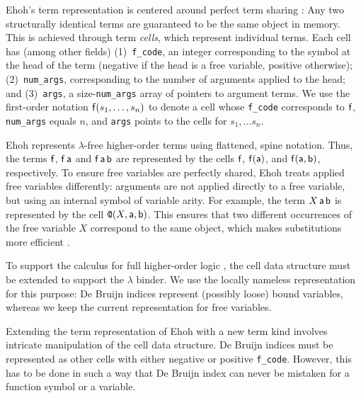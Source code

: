 Ehoh's term representation is centered around perfect term sharing %
\cite{ls-01-shared}: Any two structurally identical terms are
guaranteed to be the same object in memory. This is achieved through term
\emph{cells}, which represent individual terms. Each cell has (among other fields)
(1)~\texttt{f\_code}, an integer corresponding to the symbol at the head of the term (negative
if the head is a free variable, positive otherwise); (2)~\texttt{num\_args},
corresponding to the number of arguments applied to the head; and (3)~\texttt{args},
a size-\texttt{num\_args} array of pointers to argument terms. We
use the first-order notation $\mathsf{f}(s_1, \ldots, s_n)$ to denote a cell whose
\texttt{f\_code} corresponds to $\mathsf{f}$, \texttt{num\_args} equals $n$, and
\texttt{args} points to the cells for $s_1, \ldots s_n$.

Ehoh represents $\lambda$-free higher-order terms using flattened, spine notation.
Thus, the terms $\mathsf{f}$, $\mathsf{f} \, \mathsf{a}$ and $\mathsf{f} \, \mathsf{a} \,
\mathsf{b}$ are represented by the cells $\mathsf{f}$,
$\mathsf{f}(\mathsf{a})$, and $\mathsf{f}(\mathsf{a}, \mathsf{b})$, respectively.
To ensure free variables are
perfectly shared, Ehoh treats applied free variables differently: arguments are
not applied directly to a free variable, but using an internal symbol
\internalat{} of variable arity. For example, the term $X \, \mathsf{a} \, \mathsf{b}$ is
represented by the cell $\texttt{@}(X, \mathsf{a}, \mathsf{b})$. This ensures that
two different occurrences of the free variable $X$ correspond to the same object,
which makes substitutions more efficient \cite{section-ehoh}.

 To support the calculus for full
higher-order logic \cite{bbtv-21-full-ho-sup}, the cell data structure must
be extended to support the $\lambda$ binder. We use the locally nameless
representation \cite{ac-12-locally-nameless} for this purpose: De Bruijn indices
represent (possibly loose) bound variables, whereas we keep the current
representation for free variables.

Extending the term representation of Ehoh with a new term
kind involves intricate manipulation of the cell data structure. De Bruijn
indices must be represented as other cells with either negative or positive
\texttt{f\_code}. However, this has to be done in such a way that De Bruijn
index can never be mistaken for a function symbol or a variable.

